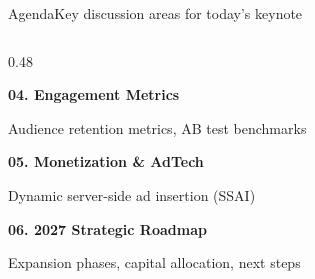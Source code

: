 \documentclass[aspectratio=169,11pt]{beamer}
\begin{document}
\begin{frame}{Agenda}{Key discussion areas for today's keynote}
\begin{columns}[T]
    \begin{column}{0.48\textwidth}
      \begin{tcolorbox}[keynotecard]
        \begin{minipage}{0.12\textwidth}
          {\Large\color{accentpurple}\faChartLine}
        \end{minipage}%
        \begin{minipage}{0.85\textwidth}
          {\small\bfseries\color{textdark} 04. Engagement Metrics} \par
          {\tiny\color{textmuted} Audience retention metrics, AB test benchmarks}
        \end{minipage}
      \end{tcolorbox}
      \vspace{3pt}
      \begin{tcolorbox}[keynotecard]
        \begin{minipage}{0.12\textwidth}
          {\Large\color{accentpurple}\faCoins}
        \end{minipage}%
        \begin{minipage}{0.85\textwidth}
          {\small\bfseries\color{textdark} 05. Monetization \& AdTech} \par
          {\tiny\color{textmuted} Dynamic server-side ad insertion (SSAI)}
        \end{minipage}
      \end{tcolorbox}
      \vspace{3pt}
      \begin{tcolorbox}[keynotecard]
        \begin{minipage}{0.12\textwidth}
          {\Large\color{accentpurple}\faFlag}
        \end{minipage}%
        \begin{minipage}{0.85\textwidth}
          {\small\bfseries\color{textdark} 06. 2027 Strategic Roadmap} \par
          {\tiny\color{textmuted} Expansion phases, capital allocation, next steps}
        \end{minipage}
      \end{tcolorbox}
    \end{column}
  \end{columns}
\end{frame}
\end{document}
